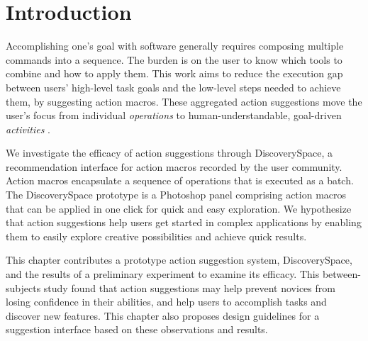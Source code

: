 \section{Introduction}

Accomplishing one's goal with software generally requires composing multiple commands into a sequence. The burden is on the user to know which tools to combine and how to apply them. This work aims to reduce the execution gap between users' high-level task goals and the low-level steps needed to achieve them, by suggesting action macros. These aggregated action suggestions move the user's focus from individual \textit{operations} to human-understandable, goal-driven \textit{activities} \cite{Li2008, Gay2004}.

We investigate the efficacy of action suggestions through Discovery\-Space, a recommendation interface for action macros recorded by the user community. Action macros encapsulate a sequence of operations that is executed as a batch. The Discovery\-Space prototype is a Photoshop panel comprising action macros that can be applied in one click for quick and easy exploration. We hypothesize that action suggestions help users get started in complex applications by enabling them to easily explore creative possibilities and achieve quick results.

This chapter contributes a prototype action suggestion system, Discovery\-Space, and the results of a preliminary experiment to examine its efficacy. This between-subjects study found that action suggestions may help prevent novices from losing confidence in their abilities, and help users to accomplish tasks and discover new features. This chapter also proposes design guidelines for a suggestion interface based on these observations and results.
